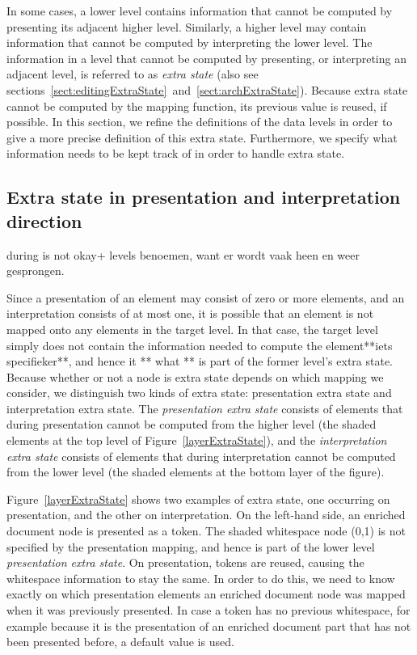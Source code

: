 In some cases, a lower level contains information that cannot be computed by presenting its adjacent higher level. Similarly, a higher level may contain information that cannot be computed by interpreting the lower level. The information in a level that cannot be computed by presenting, or interpreting an adjacent level, is referred to as {\em extra state} (also see sections~\ref{sect:editingExtraState}~and~\ref{sect:archExtraState}). Because extra state cannot be computed by the mapping function, its previous value is reused, if possible. In this section, we refine the definitions of the data levels in order to give a more precise definition of this extra state. Furthermore, we specify what information needs to be kept track of in order to handle extra state.




%																
\subsection{Extra state in presentation and interpretation direction}

\bc
during is not okay+ levels benoemen, want er wordt vaak heen en weer gesprongen.

Since a presentation of an element may consist of zero or more elements, and an interpretation consists of at most one, it is possible that an element is not mapped onto any elements in the target level. In that case, the target level simply does not contain the information needed to compute the element**iets specifieker**, and hence it ** what ** is part of the former level's extra state. Because whether or not a node is extra state depends on which mapping we consider, we distinguish two kinds of extra state: presentation extra state and interpretation extra state. The {\em presentation extra state} consists of elements that during presentation cannot be computed from the higher level (the shaded elements at the top level of Figure~\ref{layerExtraState}), and the {\em interpretation extra state} consists of elements that during interpretation cannot be computed from the lower level (the shaded elements at the bottom layer of the figure).
\ec


Figure~\ref{layerExtraState} shows two examples of extra state, one occurring on presentation, and the other on interpretation. On the left-hand side, an enriched document node is presented as a token. The shaded whitespace node (0,1) is not specified by the presentation mapping, and hence is part of the lower level {\em presentation extra state}. On presentation, tokens are reused, causing the whitespace information to stay the same. In order to do this, we need to know exactly on which presentation elements an enriched document node was mapped when it was previously presented. In case a token has no previous whitespace, for example because it is the presentation of an enriched document part that has not been presented before, a default value is used.

